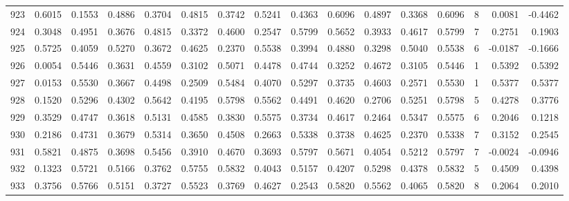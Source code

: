 \begin{tabular}{lrrrrrrrrrrrrrrr}
923 &      0.6015 &  0.1553 &  0.4886 &  0.3704 &  0.4815 &  0.3742 &  0.5241 &  0.4363 &  0.6096 &  0.4897 &   0.3368 &     0.6096 &      8 &                    0.0081 &                    -0.4462 \\
924 &      0.3048 &  0.4951 &  0.3676 &  0.4815 &  0.3372 &  0.4600 &  0.2547 &  0.5799 &  0.5652 &  0.3933 &   0.4617 &     0.5799 &      7 &                    0.2751 &                     0.1903 \\
925 &      0.5725 &  0.4059 &  0.5270 &  0.3672 &  0.4625 &  0.2370 &  0.5538 &  0.3994 &  0.4880 &  0.3298 &   0.5040 &     0.5538 &      6 &                   -0.0187 &                    -0.1666 \\
926 &      0.0054 &  0.5446 &  0.3631 &  0.4559 &  0.3102 &  0.5071 &  0.4478 &  0.4744 &  0.3252 &  0.4672 &   0.3105 &     0.5446 &      1 &                    0.5392 &                     0.5392 \\
927 &      0.0153 &  0.5530 &  0.3667 &  0.4498 &  0.2509 &  0.5484 &  0.4070 &  0.5297 &  0.3735 &  0.4603 &   0.2571 &     0.5530 &      1 &                    0.5377 &                     0.5377 \\
928 &      0.1520 &  0.5296 &  0.4302 &  0.5642 &  0.4195 &  0.5798 &  0.5562 &  0.4491 &  0.4620 &  0.2706 &   0.5251 &     0.5798 &      5 &                    0.4278 &                     0.3776 \\
929 &      0.3529 &  0.4747 &  0.3618 &  0.5131 &  0.4585 &  0.3830 &  0.5575 &  0.3734 &  0.4617 &  0.2464 &   0.5347 &     0.5575 &      6 &                    0.2046 &                     0.1218 \\
930 &      0.2186 &  0.4731 &  0.3679 &  0.5314 &  0.3650 &  0.4508 &  0.2663 &  0.5338 &  0.3738 &  0.4625 &   0.2370 &     0.5338 &      7 &                    0.3152 &                     0.2545 \\
931 &      0.5821 &  0.4875 &  0.3698 &  0.5456 &  0.3910 &  0.4670 &  0.3693 &  0.5797 &  0.5671 &  0.4054 &   0.5212 &     0.5797 &      7 &                   -0.0024 &                    -0.0946 \\
932 &      0.1323 &  0.5721 &  0.5166 &  0.3762 &  0.5755 &  0.5832 &  0.4043 &  0.5157 &  0.4207 &  0.5298 &   0.4378 &     0.5832 &      5 &                    0.4509 &                     0.4398 \\
933 &      0.3756 &  0.5766 &  0.5151 &  0.3727 &  0.5523 &  0.3769 &  0.4627 &  0.2543 &  0.5820 &  0.5562 &   0.4065 &     0.5820 &      8 &                    0.2064 &                     0.2010 \\

\end{tabular}
